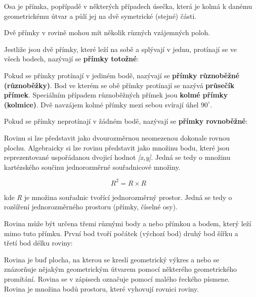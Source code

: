 
Osa je přímka, popřípadě v některých případech úsečka, která je kolmá k danému geometrickému útvar a půlí jej na dvě symetrické (stejné) části. 


Dvě přímky v rovině mohou mít několik různých vzájemných poloh. 

Jestliže jsou dvě přímky, které leží na sobě a splývají v jednu, protínají se ve všech bodech, nazývají se {\bf přímky totožné}:

\vskip 4mm
\centerline{}
\vskip 4mm

Pokud se přímky protínají v jediném bodě, nazývají se {\bf přímky různoběžné (různoběžky)}. Bod ve kterém se obě přímky protínají se nazývá {\bf průsečík přímek}. Speciálním případem různoběžných přímek jsou {\bf kolmé přímky (kolmice)}. Dvě navzájem kolmé přímky mezi sebou svírají úhel $90^\circ$.

\vskip 4mm
\centerline{}
\vskip 4mm

Pokud se přímky neprotínají v žádném bodě, nazývají se {\bf přímky rovnoběžné}:

\vskip 4mm
\centerline{}
\vskip 4mm


Rovinu si lze představit jako dvourozměrnou neomezenou dokonale rovnou plochu. Algebraicky si lze rovinu představit jako množinu bodu, které jsou reprezentované uspořádanou dvojicí hodnot {\it [x,y]}. Jedná se tedy o množinu kartézského součinu jednorozměrné souřadnicové množiny.

$$ R^2 = R \times R $$

kde {\it R} je množina souřadnic tvořící jednorozměrný prostor. Jedná se tedy o rozšíření jednorozměrného prostoru (přímky, číselné osy). 

Rovina může být určena třemi různými body a nebo přímkou a bodem, který leží mimo tuto přímku. První bod tvoří počátek (výchozí bod) druhý bod šířku a třetí bod délku roviny:

\vskip 4mm
\centerline{}
\vskip 4mm

Rovina je buď plocha, na kterou se kreslí geometrický výkres a nebo se znázorňuje nějakým geometrickým útvarem pomocí některého geometrického promítání. Rovina se v zápisech označuje pomocí malého řeckého písmene. Rovina je množina bodů prostoru, které vyhovují rovnici roviny.



